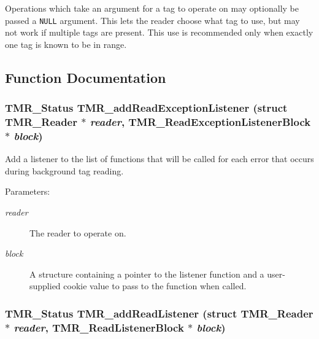 Operations which take an argument for a tag to operate on may optionally be passed a {\tt NULL} argument. This lets the reader choose what tag to use, but may not work if multiple tags are present. This use is recommended only when exactly one tag is known to be in range. 

\subsection{Function Documentation}
\hypertarget{group__reader_gda68ed4d7d5dfc41d29eb578d1d8b802}{
\subsubsection[{TMR\_\-addReadExceptionListener}]{\setlength{\rightskip}{0pt plus 5cm}TMR\_\-Status TMR\_\-addReadExceptionListener (struct {\bf TMR\_\-Reader} $\ast$ {\em reader}, \/  {\bf TMR\_\-ReadExceptionListenerBlock} $\ast$ {\em block})}}
\label{group__reader_gda68ed4d7d5dfc41d29eb578d1d8b802}


Add a listener to the list of functions that will be called for each error that occurs during background tag reading.

\begin{Desc}
\item[Parameters:]
\begin{description}
\item[{\em reader}]The reader to operate on. \item[{\em block}]A structure containing a pointer to the listener function and a user-supplied cookie value to pass to the function when called. \end{description}
\end{Desc}
\hypertarget{group__reader_g18745261e79dccc89a516eaf38cd83f2}{
\subsubsection[{TMR\_\-addReadListener}]{\setlength{\rightskip}{0pt plus 5cm}TMR\_\-Status TMR\_\-addReadListener (struct {\bf TMR\_\-Reader} $\ast$ {\em reader}, \/  {\bf TMR\_\-ReadListenerBlock} $\ast$ {\em block})}}
\label{group__reader_g18745261e79dccc89a516eaf38cd83f2}


